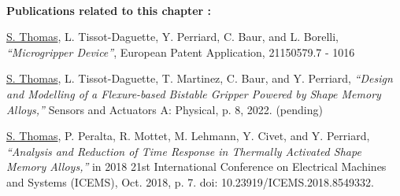 %
\vspace*{\fill}
\noindent\hrulefill \\
\textbf{\large Publications related to this chapter :}

\underline{S. Thomas}, L. Tissot-Daguette, Y. Perriard, C. Baur, and L. Borelli, \textit{“Microgripper Device”}, European Patent Application, 21150579.7 - 1016

\underline{S. Thomas}, L. Tissot-Daguette, T. Martinez, C. Baur, and Y. Perriard, \textit{“Design and Modelling of a Flexure-based Bistable Gripper Powered by Shape Memory Alloys,”} Sensors and Actuators A: Physical, p. 8, 2022. (pending)

\underline{S. Thomas}, P. Peralta, R. Mottet, M. Lehmann, Y. Civet, and Y. Perriard, \textit{“Analysis and Reduction of Time Response in Thermally Activated Shape Memory Alloys,”} in 2018 21st International Conference on Electrical Machines and Systems (ICEMS), Oct. 2018, p. 7. doi: 10.23919/ICEMS.2018.8549332.

